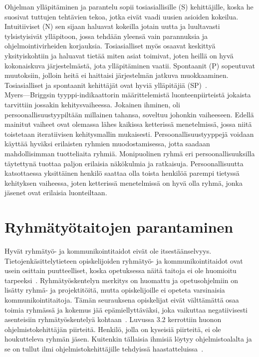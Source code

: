 \documentclass[finnish]{../tktltiki2}
\theoremstyle{definition}
\theoremstyle{remark}
\begin{document}
\pagebreak

Ohjelman ylläpitäminen ja parantelu sopii tosiasiallisille (S) kehittäjille, koska he suosivat tuttujen tehtävien tekoa, jotka eivät vaadi uusien asioiden kokeilua. Intuitiiviset (N) sen sijaan haluavat kokeilla jotain uutta ja luultavasti tylsistyisivät ylläpitoon, jossa tehdään yleensä vain parannuksia ja ohjelmointivirheiden korjauksia. Tosiasialliset
myös osaavat keskittyä yksityiskohtiin ja haluavat tietää miten asiat toimivat, joten heillä on hyvä kokonaiskuva järjestelmästä, jota ylläpitäminen vaatii. Spontaanit (P) sopeutuvat muutoksiin, jolloin heitä ei haittaisi järjestelmän jatkuva muokkaaminen. Tosiasialliset ja spontaanit kehittäjät ovat hyviä ylläpitäjiä (SP)~\cite{Capretz:2010:MSS:1726559.1726574}.\\

Myers---Briggsin tyyppi-indikaattorin määrittelemistä luonteenpiirteistä jokaista tarvittiin jossakin kehitysvaiheessa. Jokainen ihminen, oli persoonallisuustyypiltään millainen tahansa, soveltuu johonkin vaiheeseen. Edellä mainitut vaiheet ovat olemassa lähes kaikissa ketterissä menetelmissä, jossa niitä toistetaan iteratiivisen kehitysmallin mukaisesti. Persoonallisuustyyppejä voidaan käyttää hyväksi erilaisten ryhmien muodostamisessa, jotta saadaan mahdollisimman tuotteliaita ryhmiä. Monipuolinen ryhmä eri persoonallisuuksilla täytettynä tuottaa paljon erilaisia näkökulmia ja ratkaisuja. Persoonallisuutta katsottaessa yksittäinen henkilö saattaa olla toista henkilöä parempi tietyssä kehityksen vaiheessa, joten ketterissä menetelmissä on hyvä olla ryhmä, jonka jäsenet ovat erilaisia luonteiltaan.

\section{Ryhmätyötaitojen parantaminen}

Hyvät ryhmätyö- ja kommunikointitaidot eivät ole itsestäänselvyys. Tietojenkäsittelytieteen opiskelijoiden ryhmätyö- ja kommunikointitaidot ovat usein osittain puutteelliset, koska opetuksessa näitä taitoja ei ole huomioitu tarpeeksi~\cite{Cushing:2003:TBP:948785.948797,Jun:2010,Waite:2004:SCV:1028174.971308}. Ryhmätyöskentelyn merkitys on huomattu ja
opetusohjelmiin on lisätty ryhmä- ja projektitöitä, mutta opiskelijoille ei opeteta varsinaisia kommunikointitaitoja. Tämän seurauksena opiskelijat eivät välttämättä osaa toimia ryhmässä ja kokemus jää epämiellyttäväksi, joka vaikuttaa negatiivisesti asenteisiin ryhmätyöskentelyä kohtaan~\cite{1158709}.
Luvussa 3.2 kerrottiin huonon ohjelmistokehittäjän piirteitä. Henkilö, jolla on kyseisiä piirteitä, ei ole houkutteleva ryhmän jäsen. Kuitenkin tällaisia ihmisiä löytyy ohjelmistoalalta ja se on tullut ilmi ohjelmistokehittäjille tehdyissä haastatteluissa~\cite{Begel:2008:PPW:1414004.1414026,Hall:2007:CNT:1235000.1235043}.\\
\end{document}
